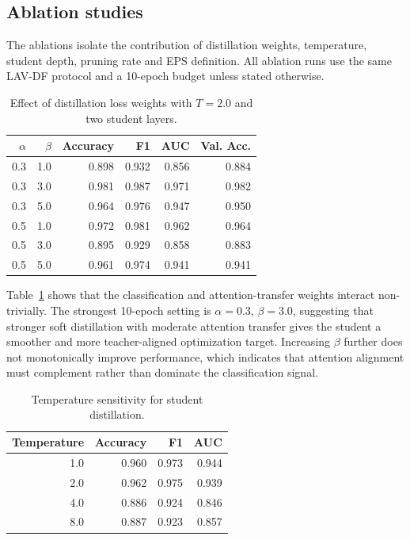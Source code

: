 \documentclass[pdflatex,sn-basic,Numbered]{sn-jnl}
\begin{document}
\subsection{Ablation studies}\label{subsec:ablation}

The ablations isolate the contribution of distillation weights, temperature, student depth, pruning rate and EPS definition. All ablation runs use the same LAV-DF protocol and a 10-epoch budget unless stated otherwise.

\begin{table}[t]
\caption{Effect of distillation loss weights with $T=2.0$ and two student layers.}\label{tab:loss-ablation}
\centering
\scriptsize
\setlength{\tabcolsep}{6pt}
\begin{tabular}{rrrrrr}
\toprule
$\alpha$ & $\beta$ & Accuracy & F1 & AUC & Val. Acc. \\
\midrule
0.3 & 1.0 & 0.898 & 0.932 & 0.856 & 0.884 \\
0.3 & 3.0 & 0.981 & 0.987 & 0.971 & 0.982 \\
0.3 & 5.0 & 0.964 & 0.976 & 0.947 & 0.950 \\
0.5 & 1.0 & 0.972 & 0.981 & 0.962 & 0.964 \\
0.5 & 3.0 & 0.895 & 0.929 & 0.858 & 0.883 \\
0.5 & 5.0 & 0.961 & 0.974 & 0.941 & 0.941 \\
\bottomrule
\end{tabular}
\end{table}

Table~\ref{tab:loss-ablation} shows that the classification and attention-transfer weights interact non-trivially. The strongest 10-epoch setting is $\alpha=0.3$, $\beta=3.0$, suggesting that stronger soft distillation with moderate attention transfer gives the student a smoother and more teacher-aligned optimization target. Increasing $\beta$ further does not monotonically improve performance, which indicates that attention alignment must complement rather than dominate the classification signal.

\begin{table}[t]
\caption{Temperature sensitivity for student distillation.}\label{tab:temperature}
\centering
\scriptsize
\setlength{\tabcolsep}{8pt}
\begin{tabular}{rrrr}
\toprule
Temperature & Accuracy & F1 & AUC \\
\midrule
1.0 & 0.960 & 0.973 & 0.944 \\
2.0 & 0.962 & 0.975 & 0.939 \\
4.0 & 0.886 & 0.924 & 0.846 \\
8.0 & 0.887 & 0.923 & 0.857 \\
\bottomrule
\end{tabular}
\end{table}
\end{document}
